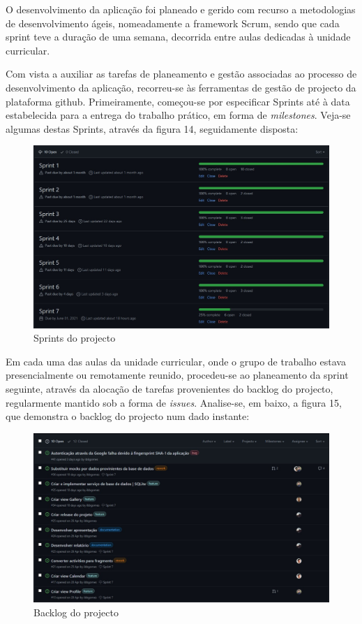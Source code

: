 \documentclass[12pt]{report}
\begin{document}
O desenvolvimento da aplicação foi planeado e gerido com recurso a metodologias de desenvolvimento ágeis, nomeadamente a \gls{framework} Scrum, sendo que cada \gls{sprint} teve a duração de uma semana, decorrida entre aulas dedicadas à unidade curricular.

Com vista a auxiliar as tarefas de planeamento e gestão associadas ao processo de desenvolvimento da aplicação, recorreu-se às ferramentas de gestão de projecto da plataforma \gls{github}. Primeiramente, começou-se por especificar Sprints até à data estabelecida para a entrega do trabalho prático, em forma de \textit{milestones}. Veja-se algumas destas Sprints, através da figura 14, seguidamente disposta:

\bigskip
\begin{figure}[H]
    \centering
    \includegraphics[width=1\textwidth]{sprints.png}
    \caption{Sprints do projecto}
\end{figure}

Em cada uma das aulas da unidade curricular, onde o grupo de trabalho estava presencialmente ou remotamente reunido, procedeu-se ao planeamento da \gls{sprint} seguinte, através da alocação de tarefas provenientes do \gls{backlog} do projecto, regularmente mantido sob a forma de \textit{issues}. Analise-se, em baixo, a figura 15, que demonstra o \gls{backlog} do projecto num dado instante:

\bigskip
\begin{figure}[H]
    \centering
    \includegraphics[width=1\textwidth]{backlog.png}
    \caption{Backlog do projecto}
\end{figure}
\end{document}
